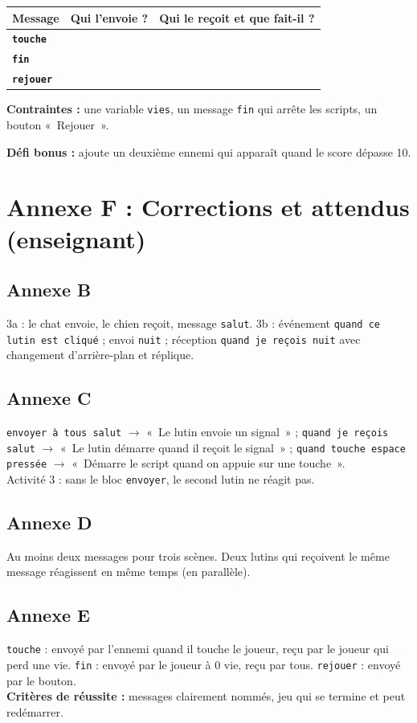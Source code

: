 \documentclass[11pt,a4paper]{article}
\begin{document}
\begin{tabularx}{\linewidth}{>{\bfseries}p{3.4cm}Y Y}
\toprule
Message & Qui l'envoie ? & Qui le reçoit et que fait-il ?\\
\midrule
\texttt{touche} & & \\
\texttt{fin} & & \\
\texttt{rejouer} & & \\
\bottomrule
\end{tabularx}

\textbf{Contraintes :} une variable \texttt{vies}, un message \texttt{fin} qui arrête les scripts, un bouton «~Rejouer~».

\textbf{Défi bonus :} ajoute un deuxième ennemi qui apparaît quand le score dépasse 10.

\newpage
\section*{Annexe F : Corrections et attendus (enseignant)}

\subsection*{Annexe B}
3a : le chat envoie, le chien reçoit, message \texttt{salut}. 3b : événement \texttt{quand ce lutin est cliqué} ; envoi \texttt{nuit} ; réception \texttt{quand je reçois nuit} avec changement d'arrière-plan et réplique.

\subsection*{Annexe C}
\texttt{envoyer à tous salut} $\rightarrow$ «~Le lutin envoie un signal~» ; \texttt{quand je reçois salut} $\rightarrow$ «~Le lutin démarre quand il reçoit le signal~» ; \texttt{quand touche espace pressée} $\rightarrow$ «~Démarre le script quand on appuie sur une touche~».\\
Activité 3 : sans le bloc \texttt{envoyer}, le second lutin ne réagit pas.

\subsection*{Annexe D}
Au moins deux messages pour trois scènes. Deux lutins qui reçoivent le même message réagissent en même temps (en parallèle).

\subsection*{Annexe E}
\texttt{touche} : envoyé par l'ennemi quand il touche le joueur, reçu par le joueur qui perd une vie. \texttt{fin} : envoyé par le joueur à 0 vie, reçu par tous. \texttt{rejouer} : envoyé par le bouton.\\
\textbf{Critères de réussite :} messages clairement nommés, jeu qui se termine et peut redémarrer.
\end{document}
